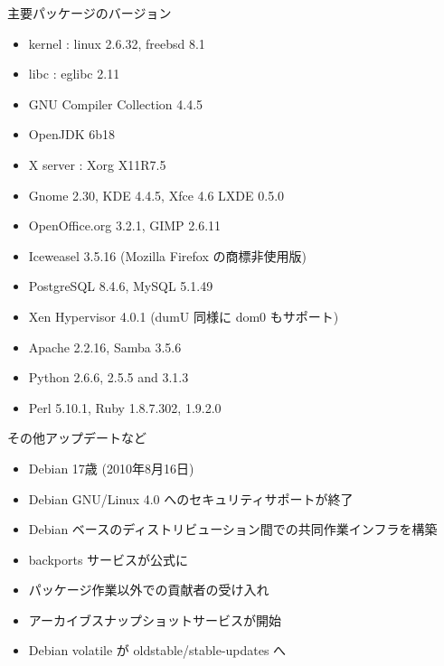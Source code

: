 \begin{frame}{主要パッケージのバージョン}
\begin{itemize}
\item kernel : linux 2.6.32, freebsd 8.1
\item libc : eglibc 2.11
\item GNU Compiler Collection 4.4.5
\item OpenJDK 6b18
\item X server : Xorg X11R7.5
\item Gnome 2.30, KDE 4.4.5, Xfce 4.6 LXDE 0.5.0
\item OpenOffice.org 3.2.1, GIMP 2.6.11
\item Iceweasel 3.5.16 (Mozilla Firefox の商標非使用版)
\item PostgreSQL 8.4.6, MySQL 5.1.49
\item Xen Hypervisor 4.0.1 (dumU 同様に dom0 もサポート)
\item Apache 2.2.16, Samba 3.5.6
\item Python 2.6.6, 2.5.5 and 3.1.3
\item Perl 5.10.1, Ruby 1.8.7.302, 1.9.2.0
\end{itemize}
\end{frame}

\begin{frame}{その他アップデートなど}
\begin{itemize}
\item Debian 17歳 (2010年8月16日)
\item Debian GNU/Linux 4.0 へのセキュリティサポートが終了
\item Debian ベースのディストリビューション間での共同作業インフラを構築
\item backports サービスが公式に
\item パッケージ作業以外での貢献者の受け入れ
\item アーカイブスナップショットサービスが開始
\item Debian volatile が oldstable/stable-updates へ
\end{itemize}

\end{frame}



